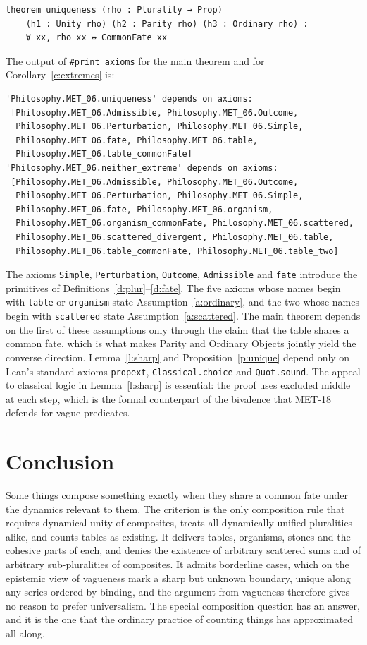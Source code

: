 \documentclass{situationist-preprint}
\begin{document}
\begin{lstlisting}
theorem uniqueness (rho : Plurality → Prop)
    (h1 : Unity rho) (h2 : Parity rho) (h3 : Ordinary rho) :
    ∀ xx, rho xx ↔ CommonFate xx
\end{lstlisting}

The output of \texttt{\#print axioms} for the main theorem and for Corollary~\ref{c:extremes} is:

\begin{lstlisting}
'Philosophy.MET_06.uniqueness' depends on axioms:
 [Philosophy.MET_06.Admissible, Philosophy.MET_06.Outcome,
  Philosophy.MET_06.Perturbation, Philosophy.MET_06.Simple,
  Philosophy.MET_06.fate, Philosophy.MET_06.table,
  Philosophy.MET_06.table_commonFate]
'Philosophy.MET_06.neither_extreme' depends on axioms:
 [Philosophy.MET_06.Admissible, Philosophy.MET_06.Outcome,
  Philosophy.MET_06.Perturbation, Philosophy.MET_06.Simple,
  Philosophy.MET_06.fate, Philosophy.MET_06.organism,
  Philosophy.MET_06.organism_commonFate, Philosophy.MET_06.scattered,
  Philosophy.MET_06.scattered_divergent, Philosophy.MET_06.table,
  Philosophy.MET_06.table_commonFate, Philosophy.MET_06.table_two]
\end{lstlisting}

The axioms \texttt{Simple}, \texttt{Perturbation}, \texttt{Outcome}, \texttt{Admissible} and \texttt{fate} introduce the primitives of Definitions~\ref{d:plur}--\ref{d:fate}. The five axioms whose names begin with \texttt{table} or \texttt{organism} state Assumption~\ref{a:ordinary}, and the two whose names begin with \texttt{scattered} state Assumption~\ref{a:scattered}. The main theorem depends on the first of these assumptions only through the claim that the table shares a common fate, which is what makes Parity and Ordinary Objects jointly yield the converse direction. Lemma~\ref{l:sharp} and Proposition~\ref{p:unique} depend only on Lean's standard axioms \texttt{propext}, \texttt{Classical.choice} and \texttt{Quot.sound}. The appeal to classical logic in Lemma~\ref{l:sharp} is essential: the proof uses excluded middle at each step, which is the formal counterpart of the bivalence that MET-18 defends for vague predicates.

\section{Conclusion}

Some things compose something exactly when they share a common fate under the dynamics relevant to them. The criterion is the only composition rule that requires dynamical unity of composites, treats all dynamically unified pluralities alike, and counts tables as existing. It delivers tables, organisms, stones and the cohesive parts of each, and denies the existence of arbitrary scattered sums and of arbitrary sub-pluralities of composites. It admits borderline cases, which on the epistemic view of vagueness mark a sharp but unknown boundary, unique along any series ordered by binding, and the argument from vagueness therefore gives no reason to prefer universalism. The special composition question has an answer, and it is the one that the ordinary practice of counting things has approximated all along.
\end{document}
